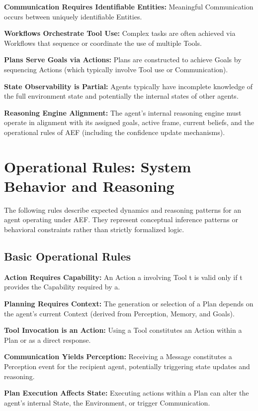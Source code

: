 \documentclass[10pt,a4paper]{article}
\begin{document}
\textbf{Communication Requires Identifiable Entities:} Meaningful Communication occurs between uniquely identifiable Entities.

\textbf{Workflows Orchestrate Tool Use:} Complex tasks are often achieved via Workflows that sequence or coordinate the use of multiple Tools.

\textbf{Plans Serve Goals via Actions:} Plans are constructed to achieve Goals by sequencing Actions (which typically involve Tool use or Communication).

\textbf{State Observability is Partial:} Agents typically have incomplete knowledge of the full environment state and potentially the internal states of other agents.

\textbf{Reasoning Engine Alignment:} The agent's internal reasoning engine must operate in alignment with its assigned goals, active frame, current beliefs, and the operational rules of AEF (including the confidence update mechanisms).

\section{Operational Rules: System Behavior and Reasoning}
The following rules describe expected dynamics and reasoning patterns for an agent operating under AEF. They represent conceptual inference patterns or behavioral constraints rather than strictly formalized logic.

\subsection{Basic Operational Rules}
\textbf{Action Requires Capability:} An Action a involving Tool t is valid only if t provides the Capability required by a.

\textbf{Planning Requires Context:} The generation or selection of a Plan depends on the agent's current Context (derived from Perception, Memory, and Goals).

\textbf{Tool Invocation is an Action:} Using a Tool constitutes an Action within a Plan or as a direct response.

\textbf{Communication Yields Perception:} Receiving a Message constitutes a Perception event for the recipient agent, potentially triggering state updates and reasoning.

\textbf{Plan Execution Affects State:} Executing actions within a Plan can alter the agent's internal State, the Environment, or trigger Communication.
\end{document}
